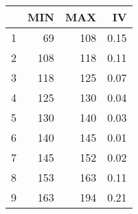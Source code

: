 \begin{table}[ht]
\centering
\begin{tabular}{rrrr}
  \hline
 & MIN & MAX & IV \\ 
  \hline
1 &  69 & 108 & 0.15 \\ 
  2 & 108 & 118 & 0.11 \\ 
  3 & 118 & 125 & 0.07 \\ 
  4 & 125 & 130 & 0.04 \\ 
  5 & 130 & 140 & 0.03 \\ 
  6 & 140 & 145 & 0.01 \\ 
  7 & 145 & 152 & 0.02 \\ 
  8 & 153 & 163 & 0.11 \\ 
  9 & 163 & 194 & 0.21 \\ 
   \hline
\end{tabular}
\end{table}
